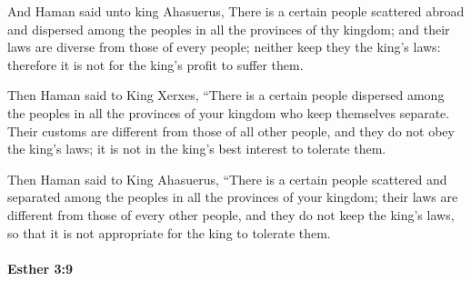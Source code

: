 			\begin{versebox}
					\item[BHS] 
					\item[LXX] 
					\item[ASV] And Haman said unto king Ahasuerus, There is a certain people scattered abroad and dispersed among the peoples in all the provinces of thy kingdom; and their laws are diverse from those of every people; neither keep they the king's laws: therefore it is not for the king's profit to suffer them.
					\item[NIV] Then Haman said to King Xerxes, “There is a certain people dispersed among the peoples in all the provinces of your kingdom who keep themselves separate. Their customs are different from those of all other people, and they do not obey the king’s laws; it is not in the king’s best interest to tolerate them.
					\item[NRSV] Then Haman said to King Ahasuerus, “There is a certain people scattered and separated among the peoples in all the provinces of your kingdom; their laws are different from those of every other people, and they do not keep the king’s laws, so that it is not appropriate for the king to tolerate them.
			\end{versebox}

		\paragraph{Esther 3:9} %
			\label{ESTHER-3-9}

